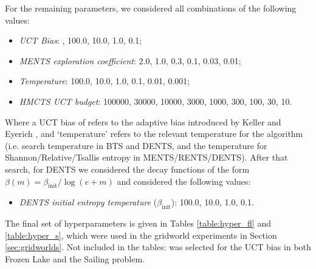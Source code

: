         For the remaining parameters, we considered all combinations of the following values:
        \begin{itemize}
            \item \textit{UCT Bias}: %
                , 100.0, 10.0, 1.0, 0.1;
            \item \textit{MENTS exploration coefficient}: 2.0, 1.0, 0.3, 0.1, 0.03, 0.01;
            \item \textit{Temperature}: 100.0, 10.0, 1.0, 0.1, 0.01, 0.001;
            \item \textit{HMCTS UCT budget}: 100000, 30000, 10000, 3000, 1000, 300, 100, 30, 10.
        \end{itemize}
        
         Where a UCT bias of %
          refers to the adaptive bias introduced by Keller and Eyerich %
          , and `temperature' refers to the relevant temperature for the algorithm (i.e. search temperature in BTS and DENTS, and the temperature for Shannon/Relative/Tsallis entropy in MENTS/RENTS/DENTS). After that search, for DENTS we considered the decay functions of the form $\beta(m)=\beta_{\text{init}}/\log(e+m)$ and considered the following values:
        \begin{itemize}
        		\item \textit{DENTS initial entropy temperature} ($\beta_{\text{init}}$): 100.0, 10.0, 1.0, 0.1.
        \end{itemize}
        The final set of hyperparameters is given in Tables \ref{table:hyper_fl} and \ref{table:hyper_s}, which were used in the gridworld experiments in Section \ref{sec:gridworlds}. Not included in the tables: %
         was selected for the UCT bias in both Frozen Lake and the Sailing problem.
    
